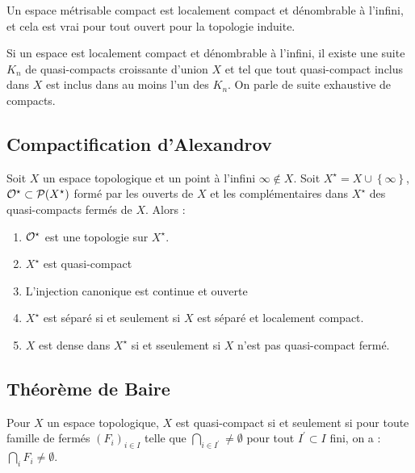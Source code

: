 \documentclass{cours}
\begin{document}
\begin{lemma}
    Un espace métrisable compact est localement compact et dénombrable à l'infini, et cela est vrai pour tout ouvert pour la topologie induite.
\end{lemma}

\begin{theorem}
    Si un espace est localement compact et dénombrable à l'infini, il existe une suite $K_{n}$ de quasi-compacts croissante d'union $X$ et tel que tout quasi-compact inclus dans $X$ est inclus dans au moins l'un des $K_{n}$. On parle de suite exhaustive de compacts.
\end{theorem}

\subsection{Compactification d'Alexandrov}
\begin{theorem}
    Soit $X$ un espace topologique et un point à l'infini $\infty \notin X$. Soit $X^{\star} = X\cup \left\{\infty\right\}$, $\mathcal{O}^{\star} \subset \mathcal{P}(X^{\star})$ formé par les ouverts de $X$ et les complémentaires dans $X^{\star}$ des quasi-compacts fermés de $X$. Alors : 
    \begin{enumerate}
        \item $\mathcal{O}^{\star}$ est une topologie sur $X^{\star}$.
        \item $X^{\star}$ est quasi-compact
        \item L'injection canonique est continue et ouverte
        \item $X^{\star}$ est séparé si et seulement si $X$ est séparé et localement compact.
        \item $X$ est dense dans $X^{\star}$ si et sseulement si $X$ n'est pas quasi-compact fermé.
    \end{enumerate}
\end{theorem}

\subsection{Théorème de Baire}
\begin{lemma}
    Pour $X$ un espace topologique, $X$ est quasi-compact si et seulement si pour toute famille de fermés $(F_{i})_{i \in I}$ telle que $\bigcap_{i\in I^{'}} \neq \emptyset$ pour tout $I^{'} \subset I$ fini, on a : $\bigcap_{i} F_{i} \neq \emptyset$.
\end{lemma}
\end{document}
